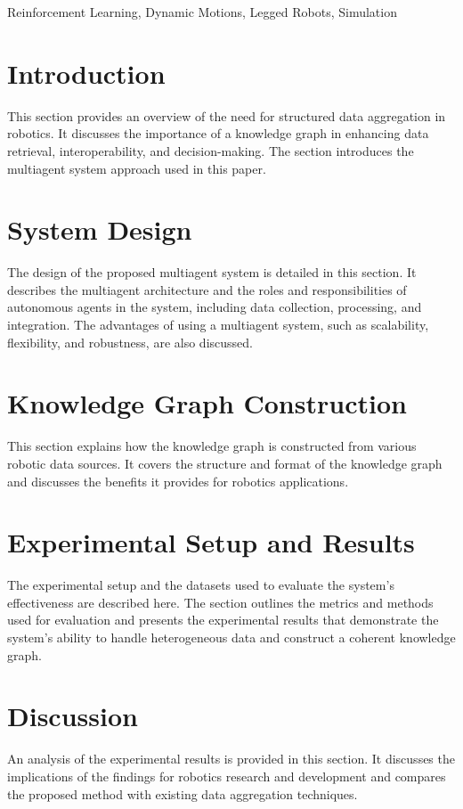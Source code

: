 \documentclass[journal]{IEEEtran}
\begin{document}
\begin{IEEEkeywords}
    Reinforcement Learning, Dynamic Motions, Legged Robots, Simulation
\end{IEEEkeywords}


\section{Introduction}
This section provides an overview of the need for structured data aggregation in robotics. It discusses the importance of a knowledge graph in enhancing data retrieval, interoperability, and decision-making. The section introduces the multiagent system approach used in this paper.

\section{System Design}
The design of the proposed multiagent system is detailed in this section. It describes the multiagent architecture and the roles and responsibilities of autonomous agents in the system, including data collection, processing, and integration. The advantages of using a multiagent system, such as scalability, flexibility, and robustness, are also discussed.

\section{Knowledge Graph Construction}
This section explains how the knowledge graph is constructed from various robotic data sources. It covers the structure and format of the knowledge graph and discusses the benefits it provides for robotics applications.

\section{Experimental Setup and Results}
The experimental setup and the datasets used to evaluate the system's effectiveness are described here. The section outlines the metrics and methods used for evaluation and presents the experimental results that demonstrate the system's ability to handle heterogeneous data and construct a coherent knowledge graph.

\section{Discussion}
An analysis of the experimental results is provided in this section. It discusses the implications of the findings for robotics research and development and compares the proposed method with existing data aggregation techniques.
\end{document}
